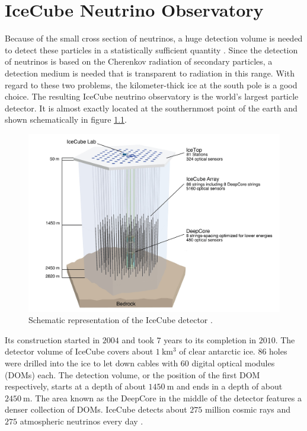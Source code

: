 \chapter{IceCube Neutrino Observatory} \label{sec:icecube}

Because of the small cross section of neutrinos, a huge detection volume is needed to detect these particles in a statistically sufficient quantity \cite{cross_n}.
Since the detection of neutrinos is based on the Cherenkov radiation of secondary particles, a detection medium is needed that is transparent to radiation in this range.
With regard to these two problems, the kilometer-thick ice at the south pole is a good choice.
The resulting IceCube neutrino observatory is the world's largest particle detector.
It is almost exactly located at the southernmost point of the earth and shown schematically in figure \ref{fig:icecube}.

\begin{figure}
    \centering
    \includegraphics[width=\linewidth]{Plots/01_7_icecube/IceCube-Array.jpg}
    \caption{Schematic representation of the IceCube detector \cite{icecube_website}.}
    \label{fig:icecube}
\end{figure}

Its construction started in $\num{2004}$ and took $\num{7}$ years to its completion in $\num{2010}$.
The detector volume of IceCube covers about $\SI{1}{\kilo\meter\tothe{3}}$ of clear antarctic ice.
$\num{86}$ holes were drilled into the ice to let down cables with $\num{60}$ digital optical modules (DOMs) each.
The detection volume, or the position of the first DOM respectively, starts at a depth of about $\SI{1450}{\meter}$ and ends in a depth of about $\SI{2450}{\meter}$.
The area known as the DeepCore in the middle of the detector features a denser collection of DOMs.
IceCube detects about $\num{275}$ million cosmic rays and $\num{275}$ atmospheric neutrinos every day \cite{icecube_website}.

